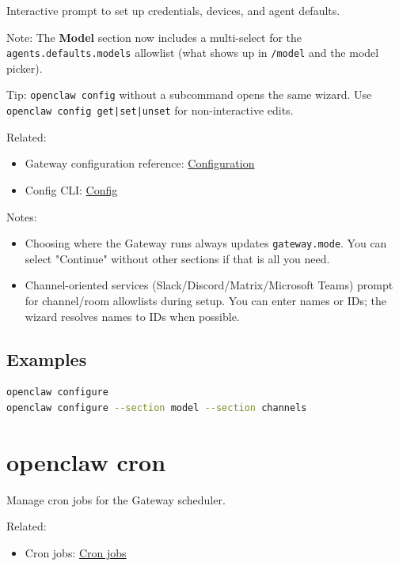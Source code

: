 Interactive prompt to set up credentials, devices, and agent defaults.

Note: The \textbf{Model} section now includes a multi-select for the
\texttt{agents.defaults.models} allowlist (what shows up in \texttt{/model} and the model picker).

Tip: \texttt{openclaw config} without a subcommand opens the same wizard. Use
\texttt{openclaw config get|set|unset} for non-interactive edits.

Related:

\begin{itemize}
  \item Gateway configuration reference: \href{/gateway/configuration}{Configuration}
  \item Config CLI: \href{/cli/config}{Config}
\end{itemize}


Notes:

\begin{itemize}
  \item Choosing where the Gateway runs always updates \texttt{gateway.mode}. You can select "Continue" without other sections if that is all you need.
  \item Channel-oriented services (Slack/Discord/Matrix/Microsoft Teams) prompt for channel/room allowlists during setup. You can enter names or IDs; the wizard resolves names to IDs when possible.
\end{itemize}


\subsection{Examples}


\begin{lstlisting}[language=bash]
openclaw configure
openclaw configure --section model --section channels
\end{lstlisting}



\clearpage

\section{openclaw cron}


Manage cron jobs for the Gateway scheduler.

Related:

\begin{itemize}
  \item Cron jobs: \href{/automation/cron-jobs}{Cron jobs}
\end{itemize}



